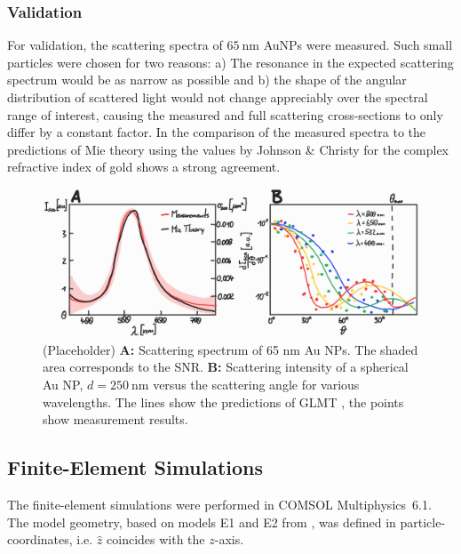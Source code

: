 \documentclass[10pt]{article}
\begin{document}
\begin{multicols}{2}
\subsubsection*{Validation}

For validation, the scattering spectra of $\SI{65}{\nano\meter}$ AuNPs were measured. 
Such small particles were chosen for two reasons: 
a) The resonance in the expected scattering spectrum would be as narrow as possible and b) the shape of the angular distribution of scattered light would not change appreciably over the spectral range of interest, causing the measured and full scattering cross-sections to only differ by a constant factor. 
In the comparison of the measured spectra to the predictions of Mie theory \cite{Mie1908, BohrenHuffman, GouesbetGrehan} using the values by Johnson \& Christy \cite{Johnson1972} for the complex refractive index of gold shows a strong agreement. 

\begin{figure}[t]
    \centering
    \includegraphics[width=\textwidth]{[fig] AuNP (placeholder).jpg}
    \caption{(Placeholder) 
    {\sffamily\bfseries A:} Scattering spectrum of 65 nm Au NPs. The shaded area corresponds to the SNR. 
    {\sffamily\bfseries B:} Scattering intensity of a spherical Au NP, $d=\SI{250}{\nano\meter}$ versus the scattering angle for various wavelengths. The lines show the predictions of GLMT \cite{GouesbetGrehan}, the points show measurement results.
    }
    \label{fig:AuNP}
\end{figure}





\subsection*{Finite-Element Simulations}

The finite-element simulations were performed in COMSOL \mbox{Multiphysics 6.1}. 
The model geometry, based on models E1 and E2 from \cite{BA}, was defined in particle-coordinates, i.e. $\hat{z}$ coincides with the $z$-axis. 


\end{multicols}
\end{document}
